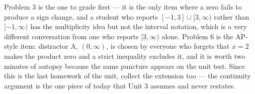 \documentclass[10pt]{article}
\begin{document}
\begin{teachernote}[Homework]
Problem 3 is the one to grade first --- it is the only item where a zero fails
to produce a sign change, and a student who reports $[-1,3] \cup [3,\infty)$
rather than $[-1,\infty)$ has the multiplicity idea but not the interval
notation, which is a very different conversation from one who reports
$[3,\infty)$ alone. Problem 6 is the AP-style item: distractor A, $(0,\infty)$,
is chosen by everyone who forgets that $x = 2$ makes the product zero and a
strict inequality excludes it, and it is worth two minutes of autopsy because
the same puncture appears on the unit test. Since this is the last homework of
the unit, collect the extension too --- the continuity argument is the one
piece of today that Unit 3 assumes and never restates.
\end{teachernote}
\end{document}

